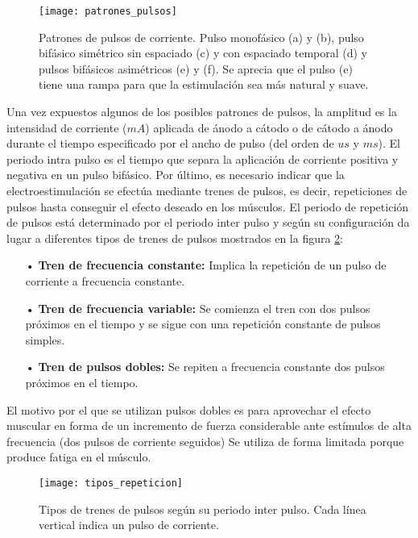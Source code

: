 \begin{figure}[!htb]
\centering
\texttt{[image: patrones\_pulsos]}
  \caption{Patrones de pulsos de corriente\cite{FES}. Pulso monofásico (a) y (b), pulso bifásico simétrico sin espaciado (c) y con espaciado temporal (d) y pulsos bifásicos asimétricos (e) y (f). Se aprecia que el pulso (e) tiene una rampa para que la estimulación sea más natural y suave.}\label{fig:patrones_pulsos}
\end{figure}

Una vez expuestos algunos de los posibles patrones de pulsos, la amplitud es la intensidad de corriente ($mA$) aplicada de ánodo a cátodo o de cátodo a ánodo durante el tiempo especificado por el ancho de pulso (del orden de $us$ y $ms$). El periodo intra pulso es el tiempo que separa la aplicación de corriente positiva y negativa en un pulso bifásico. Por último, es necesario indicar que la electroestimulación se efectúa mediante trenes de pulsos, es decir, repeticiones de pulsos hasta conseguir el efecto deseado en los músculos. El periodo de repetición de pulsos está determinado por el periodo inter pulso y según su configuración da lugar a diferentes tipos de trenes de pulsos\cite{tipos_repeticion} mostrados en la figura \ref{fig:tipos_repeticion}:


\begin{itemize}
\item[•] \textbf{Tren de frecuencia constante:} Implica la repetición de un pulso de corriente a frecuencia constante. 
\item[•] \textbf{Tren de frecuencia variable:} Se comienza el tren con dos pulsos próximos en el tiempo y se sigue con una repetición constante de pulsos simples.
\item[•] \textbf{Tren de pulsos dobles:} Se repiten a frecuencia constante dos pulsos próximos en el tiempo. 
\end{itemize}

El motivo por el que se utilizan pulsos dobles es para aprovechar el efecto muscular en forma de un incremento de fuerza considerable ante estímulos de alta frecuencia (dos pulsos de corriente seguidos) Se utiliza de forma limitada porque produce fatiga en el músculo\cite{catch_like}.\\

\begin{figure}[!htb]
\centering
\texttt{[image: tipos\_repeticion]}
  \caption{Tipos de trenes de pulsos según su periodo inter pulso. Cada línea vertical indica un pulso de corriente.}\label{fig:tipos_repeticion}
\end{figure}

